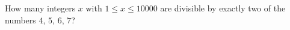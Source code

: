 How many integers $x$ with $1\le x\le10000$ are divisible by exactly two of the numbers $4$, $5$, $6$, $7$?
